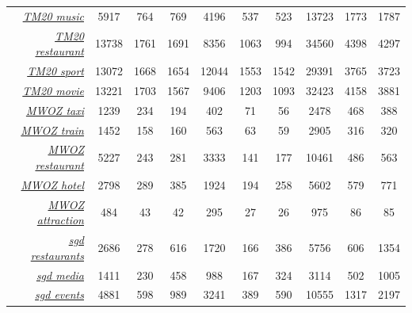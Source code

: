 \documentclass[11pt,a4paper]{article}
\begin{document}
\begin{table}[t]
\begin{tabular}{r|ccc|ccc|ccc}
{\ul \textit{TM20 music}}            & 5917           & 764          & 769           & 4196           & 537          & 523           & 13723          & 1773         & 1787          \\
{\ul \textit{TM20 restaurant}}       & 13738          & 1761         & 1691          & 8356           & 1063         & 994           & 34560          & 4398         & 4297          \\
{\ul \textit{TM20 sport}}            & 13072          & 1668         & 1654          & 12044          & 1553         & 1542          & 29391          & 3765         & 3723          \\
{\ul \textit{TM20 movie}}            & 13221          & 1703         & 1567          & 9406           & 1203         & 1093          & 32423          & 4158         & 3881          \\
{\ul \textit{MWOZ taxi}}             & 1239           & 234          & 194           & 402            & 71           & 56            & 2478           & 468          & 388           \\
{\ul \textit{MWOZ train}}            & 1452           & 158          & 160           & 563            & 63           & 59            & 2905           & 316          & 320           \\
{\ul \textit{MWOZ restaurant}}       & 5227           & 243          & 281           & 3333           & 141          & 177           & 10461          & 486          & 563           \\
{\ul \textit{MWOZ hotel}}            & 2798           & 289          & 385           & 1924           & 194          & 258           & 5602           & 579          & 771           \\
{\ul \textit{MWOZ attraction}}       & 484            & 43           & 42            & 295            & 27           & 26            & 975            & 86           & 85            \\
{\ul \textit{sgd restaurants}}       & 2686           & 278          & 616           & 1720           & 166          & 386           & 5756           & 606          & 1354          \\
{\ul \textit{sgd media}}             & 1411           & 230          & 458           & 988            & 167          & 324           & 3114           & 502          & 1005          \\
{\ul \textit{sgd events}}            & 4881           & 598          & 989           & 3241           & 389          & 590           & 10555          & 1317         & 2197          \\

\end{tabular}
\end{table}
\end{document}

